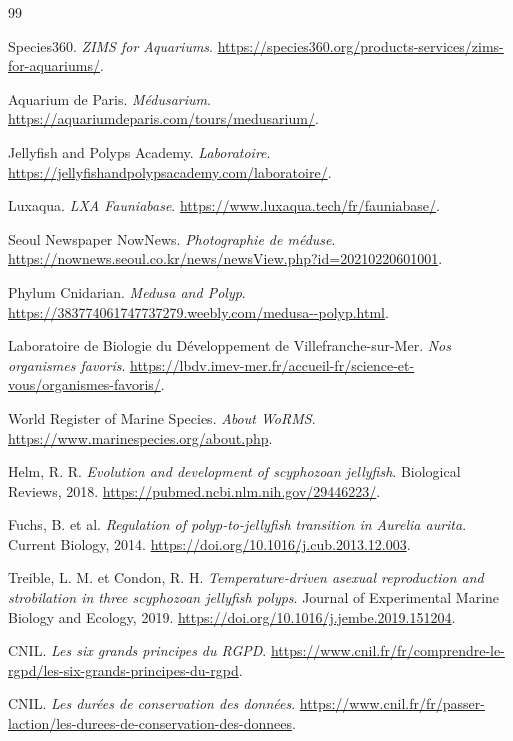 \documentclass{article}
\begin{document}
\begin{thebibliography}{99}

Species360.
\textit{ZIMS for Aquariums}.
\url{https://species360.org/products-services/zims-for-aquariums/}.

Aquarium de Paris.
\textit{Médusarium}.
\url{https://aquariumdeparis.com/tours/medusarium/}.

Jellyfish and Polyps Academy.
\textit{Laboratoire}.
\url{https://jellyfishandpolypsacademy.com/laboratoire/}.

Luxaqua.
\textit{LXA Fauniabase}.
\url{https://www.luxaqua.tech/fr/fauniabase/}.

Seoul Newspaper NowNews.
\textit{Photographie de méduse}.
\url{https://nownews.seoul.co.kr/news/newsView.php?id=20210220601001}.

Phylum Cnidarian.
\textit{Medusa and Polyp}.
\url{https://383774061747737279.weebly.com/medusa--polyp.html}.

Laboratoire de Biologie du Développement de Villefranche-sur-Mer.
\textit{Nos organismes favoris}.
\url{https://lbdv.imev-mer.fr/accueil-fr/science-et-vous/organismes-favoris/}.

World Register of Marine Species.
\textit{About WoRMS}.
\url{https://www.marinespecies.org/about.php}.

Helm, R. R.
\textit{Evolution and development of scyphozoan jellyfish}.
Biological Reviews, 2018.
\url{https://pubmed.ncbi.nlm.nih.gov/29446223/}.

Fuchs, B. et al.
\textit{Regulation of polyp-to-jellyfish transition in Aurelia aurita}.
Current Biology, 2014.
\url{https://doi.org/10.1016/j.cub.2013.12.003}.

Treible, L. M. et Condon, R. H.
\textit{Temperature-driven asexual reproduction and strobilation in three scyphozoan jellyfish polyps}.
Journal of Experimental Marine Biology and Ecology, 2019.
\url{https://doi.org/10.1016/j.jembe.2019.151204}.

CNIL.
\textit{Les six grands principes du RGPD}.
\url{https://www.cnil.fr/fr/comprendre-le-rgpd/les-six-grands-principes-du-rgpd}.

CNIL.
\textit{Les durées de conservation des données}.
\url{https://www.cnil.fr/fr/passer-laction/les-durees-de-conservation-des-donnees}.

\end{thebibliography}
\end{document}
